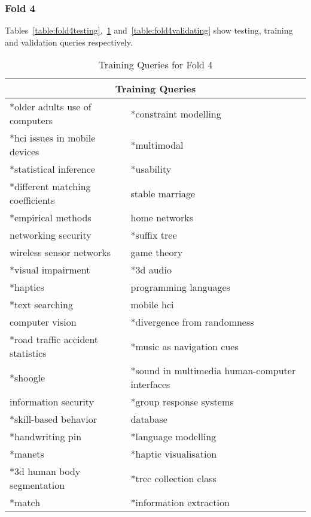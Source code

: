 \subsubsection{Fold 4}
Tables~\ref{table:fold4testing},~\ref{table:fold4training} and~\ref{table:fold4validating} show testing, training and validation queries respectively.
\begin{table}
\centering
\begin{tabular}{|l|l|}

\hline \multicolumn{2}{|c|}{\textbf{Training Queries}} \\
\hline *older adults use of computers & *constraint modelling \\
\hline *hci issues in mobile devices & *multimodal \\
\hline *statistical inference & *usability \\
\hline *different matching coefficients & stable marriage \\ 
\hline *empirical methods & home networks \\
\hline networking security & *suffix tree \\ 
\hline wireless sensor networks & game theory \\
\hline *visual impairment & *3d audio \\ 
\hline *haptics & programming languages \\
\hline *text searching & mobile hci \\ 
\hline computer vision & *divergence from randomness \\
\hline *road traffic accident statistics & *music as navigation cues \\ 
\hline *shoogle & *sound in multimedia human-computer interfaces \\
\hline information security & *group response systems \\
\hline *skill-based behavior & database \\
\hline *handwriting pin & *language modelling \\
\hline *manets & *haptic visualisation \\
\hline *3d human body segmentation & *trec collection class \\
\hline *match & *information extraction \\
\hline
\end{tabular}
\caption{Training Queries for Fold 4} \label{table:fold4training}
\end{table}

